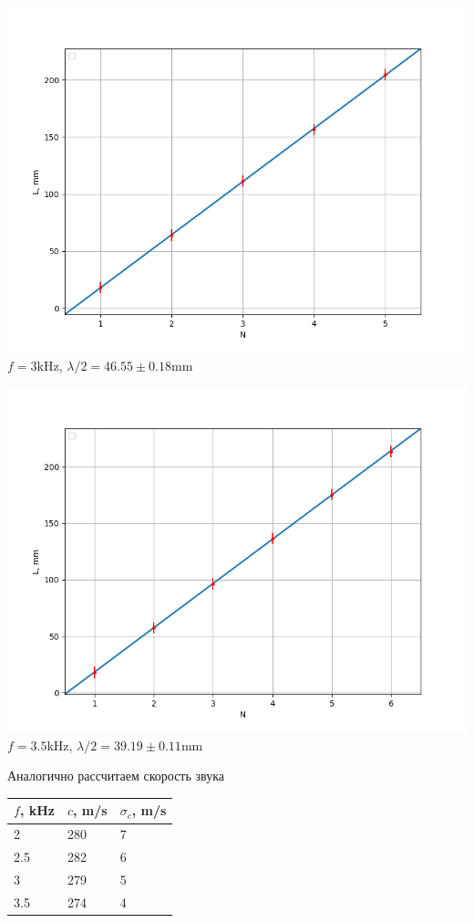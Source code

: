 \documentclass[12pt]{article}
\begin{document}
\begin{minipage}[t]{.49\textwidth}
	\vspace{0pt}
	\centering
	\includegraphics[scale = 0.45]{CO2_4.png}
	\small{$f = 3$kHz, $\lambda/2 = 46.55\pm0.18$mm}
\end{minipage}
\begin{minipage}[t]{.49\textwidth}
	\vspace{0pt}
	\centering
	\includegraphics[scale = 0.45]{CO2_5.png}
	\small{$f = 3.5$kHz, $\lambda/2 = 39.19\pm0.11$mm}
\end{minipage}

Аналогично рассчитаем скорость звука

\begin{table}[H]
	\centering
	\begin{tabular}{|l|l|l|}
		\hline
		$f$, kHz & $c$, m/s & $\sigma_c$, m/s \\ \hline
		2        & 280      & 7               \\ \hline
		2.5        & 282      & 6               \\ \hline
		3        & 279      & 5               \\ \hline
		3.5        & 274      & 4               \\ \hline
	\end{tabular}
\end{table}
\end{document}
